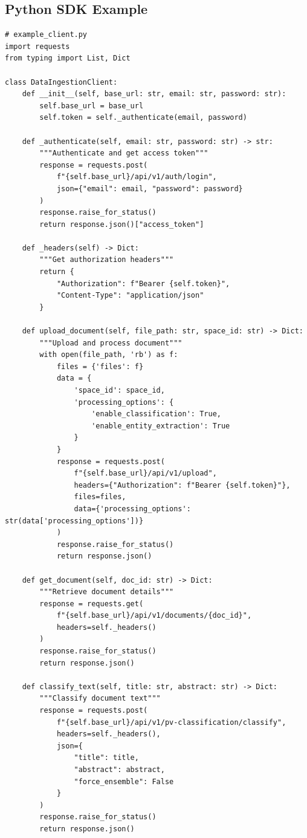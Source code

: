 \subsection{Python SDK Example}

\begin{lstlisting}[style=pythonstyle]
# example_client.py
import requests
from typing import List, Dict

class DataIngestionClient:
    def __init__(self, base_url: str, email: str, password: str):
        self.base_url = base_url
        self.token = self._authenticate(email, password)
    
    def _authenticate(self, email: str, password: str) -> str:
        """Authenticate and get access token"""
        response = requests.post(
            f"{self.base_url}/api/v1/auth/login",
            json={"email": email, "password": password}
        )
        response.raise_for_status()
        return response.json()["access_token"]
    
    def _headers(self) -> Dict:
        """Get authorization headers"""
        return {
            "Authorization": f"Bearer {self.token}",
            "Content-Type": "application/json"
        }
    
    def upload_document(self, file_path: str, space_id: str) -> Dict:
        """Upload and process document"""
        with open(file_path, 'rb') as f:
            files = {'files': f}
            data = {
                'space_id': space_id,
                'processing_options': {
                    'enable_classification': True,
                    'enable_entity_extraction': True
                }
            }
            response = requests.post(
                f"{self.base_url}/api/v1/upload",
                headers={"Authorization": f"Bearer {self.token}"},
                files=files,
                data={'processing_options': str(data['processing_options'])}
            )
            response.raise_for_status()
            return response.json()
    
    def get_document(self, doc_id: str) -> Dict:
        """Retrieve document details"""
        response = requests.get(
            f"{self.base_url}/api/v1/documents/{doc_id}",
            headers=self._headers()
        )
        response.raise_for_status()
        return response.json()
    
    def classify_text(self, title: str, abstract: str) -> Dict:
        """Classify document text"""
        response = requests.post(
            f"{self.base_url}/api/v1/pv-classification/classify",
            headers=self._headers(),
            json={
                "title": title,
                "abstract": abstract,
                "force_ensemble": False
            }
        )
        response.raise_for_status()
        return response.json()
    

\end{lstlisting}
